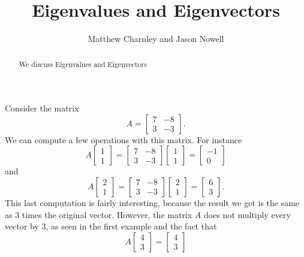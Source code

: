 \documentclass{ximera}
\title{Eigenvalues and Eigenvectors}
\author{Matthew Charnley and Jason Nowell}
\begin{document}
\begin{abstract}
    We discuss Eigenvalues and Eigenvectors
\end{abstract}
\maketitle


\label{eig:section}



Consider the matrix 
\[ 
    A = 
    \begin{bmatrix} 
        7 & -8 \\ 
        3 & -3 
    \end{bmatrix}. 
\] 
We can compute a few operations with this matrix. For instance
\[ 
    A
    \begin{bmatrix} 
        1 \\ 
        1
    \end{bmatrix} 
    = 
    \begin{bmatrix} 
        7 & -8 \\ 
        3 & -3 
    \end{bmatrix}
    \begin{bmatrix} 
        1 \\ 
        1
    \end{bmatrix} 
    = 
    \begin{bmatrix} 
        -1\\ 
        0 
    \end{bmatrix} 
\] 
and 
\[ 
    A\begin{bmatrix} 
        2 \\ 
        1
    \end{bmatrix} 
    = 
    \begin{bmatrix} 
        7 & -8 \\ 
        3 & -3 
    \end{bmatrix}
    \begin{bmatrix} 
        2 \\ 
        1
    \end{bmatrix} 
    = 
    \begin{bmatrix} 
        6\\ 
        3 
    \end{bmatrix}. 
\] 
This last computation is fairly interesting, because the result we get is the same as 3 times the original vector. However, the matrix $A$ does not multiply every vector by 3, as seen in the first example and the fact that 
\[ 
    A\begin{bmatrix} 
        4 \\ 
        3 
    \end{bmatrix} 
    = 
    \begin{bmatrix} 
        4 \\ 
        3 
    \end{bmatrix} 
\] 
\end{document}
